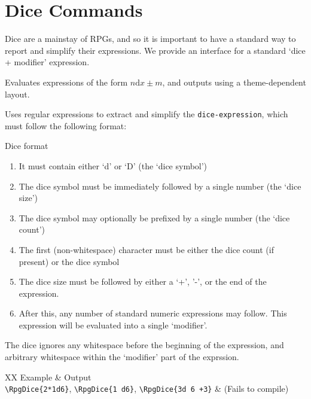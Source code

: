 	\section{Dice Commands}
		Dice are a mainstay of RPGs, and so it is important to have a standard way to report and simplify their expressions. We provide an interface for a standard `dice + modifier' expression.
		\begin{macrolist}
				{
					Evaluates expressions of the form $n\mathrm{d}x \pm m$, and outputs using a theme-dependent layout.
				}
				{
				}{
					Uses regular expressions to extract and simplify the \verb|dice-expression|, which must follow the following format:
					\begin{RpgSidebar}{Dice format}
						\begin{multicols}{2}
						\begin{enumerate}
							\item It must contain either `d' or `D' (the `dice symbol')
							\item The dice symbol must be immediately followed by a single number (the `dice size')
							\item The dice symbol may optionally be prefixed by a single number (the `dice count')
							\item The first (non-whitespace) character must be either the dice count (if present) or the dice symbol
							\item The dice size must be followed by either a `+', '-', or the end of the expression.
							\item After this, any number of standard numeric expressions may follow. This expression will be evaluated into a single `modifier'.
						\end{enumerate} 
						\end{multicols}
					\end{RpgSidebar}
					The dice ignores any whitespace before the beginning of the expression, and arbitrary whitespace within the `modifier' part of the exprssion.  
					\begin{RpgTable}{XX}
						Example & Output \\
						\verb|\RpgDice{2*1d6}|, \verb|\RpgDice{1 d6}|, \verb|\RpgDice{3d 6 +3}| & (Fails to compile)
					\end{RpgTable}
				
}
\end{macrolist}
